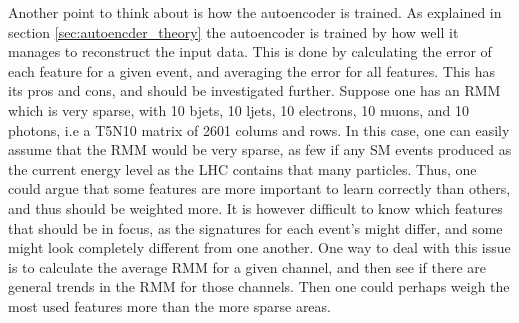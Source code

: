 Another point to think about is how the autoencoder is trained. As explained in section \ref{sec:autoencder_theory}
the autoencoder is trained by how well it manages to reconstruct the input data. This is done by 
calculating the error of each feature for a given event, and averaging the error for all features. 
This has its pros and cons, and should be investigated further. Suppose one has an RMM which is very sparse, 
with 10 bjets, 10 ljets, 10 electrons, 10 muons, and 10 photons, i.e a T5N10 matrix of 2601 colums and rows. 
In this case, one can easily assume that the RMM would be very sparse, as few if any SM events produced 
as the current energy level as the LHC contains that many particles. Thus, one could argue that some features 
are more important to learn correctly than others, and thus should be weighted more. It is however difficult to 
know which features that should be in focus, as the signatures for each event's might differ, and some 
might look completely different from one another. One way to deal with this issue is to calculate 
the average RMM for a given channel, and then see if there are general trends in the RMM for those channels. 
Then one could perhaps weigh the most used features more than the more sparse areas. 